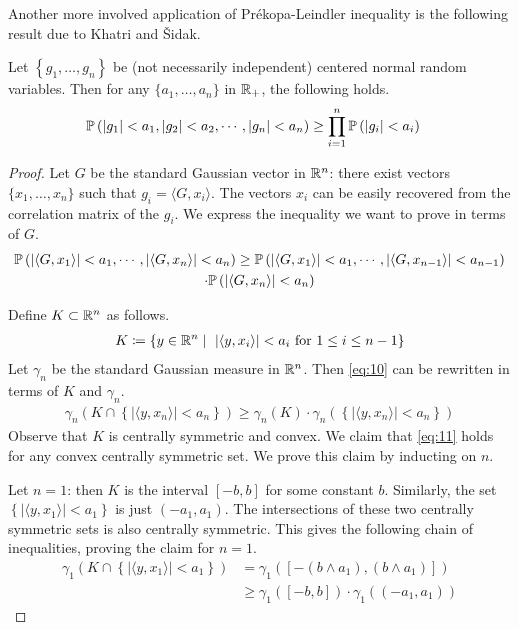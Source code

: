 \documentclass[11pt]{article}
\begin{document}
Another more involved application of Pr\'ekopa-Leindler inequality is the following result due to Khatri and Šidak.
\begin{theorem}
  Let $\left\{g_1, \ldots, g_n\right\}$ be (not necessarily independent) centered normal random variables.
  Then for any $\{a_1, \ldots, a_n\}$ in $\R_+$, the following holds.
  \begin{align*}
    \P\left( |g_1| < a_1, |g_2| < a_2,\cdots, |g_n| < a_n \right)
    &\geq \prod_{i=1}^n \P\left( |g_i| < a_i \right)
  \end{align*}
\end{theorem}
\begin{proof}
  Let $G$ be the standard Gaussian vector in $\R^n$: there exist vectors $\{x_1, \ldots, x_n\}$ such that $g_i = \langle G, x_i \rangle$.
  The vectors $x_i$ can be easily recovered from the correlation matrix of the $g_i$.
  We express the inequality we want to prove in terms of $G$.
  \begin{align}
    \label{eq:10}
  \begin{gathered}
    \P\left( |\langle G, x_1 \rangle| < a_1, \cdots, |\langle G, x_n \rangle| < a_n \right)
    \geq \P\left( |\langle G, x_1 \rangle| < a_1, \cdots, |\langle G, x_{n-1} \rangle| < a_{n-1} \right) \\
    \cdot \P\left( |\langle G, x_n \rangle| < a_n \right)
  \end{gathered}
  \end{align}

  Define $K \subset \R^n$ as follows.
  \begin{align*}
    K \coloneqq \left\{ y \in \R^n \mid\ |\langle y, x_i \rangle| < a_i\text{ for $1\leq i \leq n-1$} \right\}
  \end{align*}
  Let $\gamma_n$ be the standard Gaussian measure in $\R^n$.
  Then \eqref{eq:10} can be rewritten in terms of $K$ and $\gamma_n$.
  \begin{align}
    \label{eq:11}
      \gamma_n(K \cap \left\{ |\langle y, x_n \rangle| < a_n \right\})
      \geq \gamma_n(K) \cdot \gamma_n\left( \left\{ |\langle y, x_n \rangle| < a_n \right\} \right)
  \end{align}
  Observe that $K$ is centrally symmetric and convex.
  We claim that \eqref{eq:11} holds for any convex centrally symmetric set.
  We prove this claim by inducting on $n$.

  Let $n=1$: then $K$ is the interval $[-b,b]$ for some constant $b$.
  Similarly, the set $\left\{ |\langle y, x_1 \rangle| < a_1 \right\}$ is just $(-a_1, a_1)$.
  The intersections of these two centrally symmetric sets is also centrally symmetric.
  This gives the following chain of inequalities, proving the claim for $n=1$.
  \begin{align*}
    \gamma_1(K \cap \left\{ |\langle y, x_1 \rangle| < a_1 \right\})
    &= \gamma_1\left( [-(b \wedge a_1), (b \wedge a_1)] \right) \\
    &\geq \gamma_1([-b, b]) \cdot \gamma_1((-a_1, a_1))
  \end{align*}


\end{proof}
\end{document}
